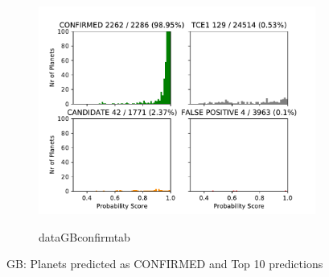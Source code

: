 \begin{figure}[H]
                \centering
                \begin{subfigure}{1\textwidth}
                \includegraphics[width = 1\textwidth]{data/GB_pred_CONFIRMED.pdf}
                \end{subfigure}
                \begin{subfigure}{1\textwidth}
                \csname dataGBconfirmtab\endcsname
                \end{subfigure}
                \caption{GB: Planets predicted as CONFIRMED and Top 10 predictions}
                \label{fig:data/GB_pred_CONFIRMED}
                \end{figure}